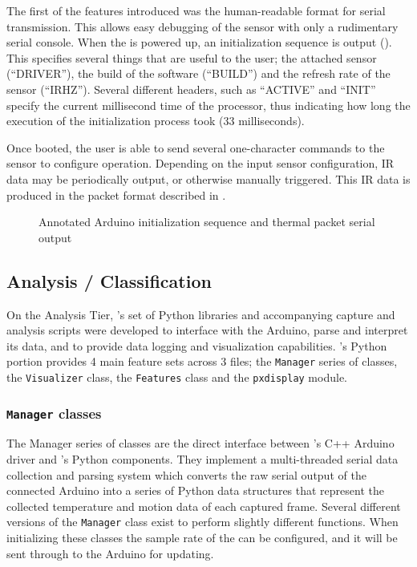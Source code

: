 \documentclass[../thesis/thesis.tex]{subfiles}
\begin{document}
The first of the features introduced was the human-readable format for serial transmission. This allows easy debugging of the sensor with only a rudimentary serial console. When the \ard is powered up, an initialization sequence is output (). This specifies several things that are useful to the user; the attached sensor (``DRIVER''), the build of the software (``BUILD'') and the refresh rate of the sensor (``IRHZ''). Several different headers, such as ``ACTIVE'' and ``INIT'' specify the current millisecond time of the processor, thus indicating how long the execution of the initialization process took (33 milliseconds).

Once booted, the user is able to send several one-character commands to the sensor to configure operation. Depending on the input sensor configuration, IR data may be periodically output, or otherwise manually triggered. This IR data is produced in the packet format described in .

\begin{figure}
 \centering

\caption{Annotated Arduino initialization sequence and thermal packet serial output}
\label{fig:code:initseq}
\end{figure}

\subsection{Analysis / Classification}

On the Analysis Tier, \tarl's set of Python libraries and accompanying capture and analysis scripts were developed to interface with the Arduino, parse and interpret its data, and to provide data logging and visualization capabilities. \tarl's Python portion provides 4 main feature sets across 3 files; the \texttt{Manager} series of classes, the \texttt{Visualizer} class, the \texttt{Features} class and the \texttt{pxdisplay} module.

\subsubsection*{\texttt{Manager} classes}
The Manager series of classes are the direct interface between \tarl's C++ Arduino driver and \tarl's Python components. They implement a multi-threaded serial data collection and parsing system which converts the raw serial output of the connected Arduino into a series of Python data structures that represent the collected temperature and motion data of each captured frame. Several different versions of the \texttt{Manager} class exist to perform slightly different functions. When initializing these classes the sample rate of the \mlx can be configured, and it will be sent through to the Arduino for updating.
\end{document}
